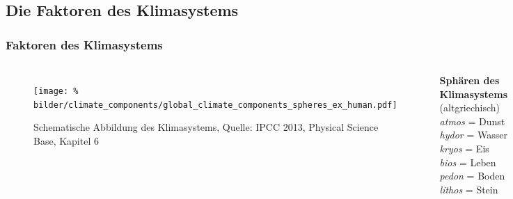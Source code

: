 
\subsection{Die Faktoren des Klimasystems}

\begin{frame}
  \frametitle{Faktoren des Klimasystems}
  \begin{columns}
	\begin{figure}
	 	\centering
	 	\texttt{[image: \%
        bilder/climate\_components/global\_climate\_components\_spheres\_ex\_human.pdf]}
	 	\caption{Schematische Abbildung des Klimasystems, Quelle: IPCC 2013, Physical Science Base, Kapitel 6} %
	\end{figure}
  \textbf{Sphären des Klimasystems}\\
  (altgriechisch)\\[1em]
  \textit{atmos} = Dunst\\
  \textit{hydor} = Wasser\\
  \textit{kryos} = Eis\\
  \textit{bios} = Leben\\
  \textit{pedon} = Boden\\
  \textit{lithos} = Stein
	\end{columns}


\end{frame}
